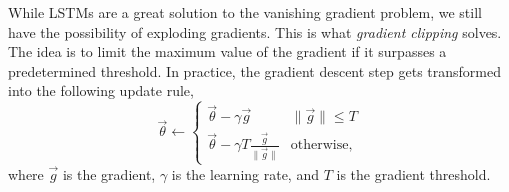 While LSTMs are a great solution to the vanishing gradient problem, we still have the possibility
of exploding gradients. This is what \textit{gradient clipping} solves. The idea is to limit the
maximum value of the gradient if it surpasses a predetermined threshold. In practice, the gradient
descent step gets transformed into the following update rule, \[
    \vec{\theta} \gets \begin{cases}
        \vec{\theta} - \gamma \vec{g}                         & \| \vec{g} \| \leq T \\
        \vec{\theta} - \gamma T \frac{\vec{g}}{\| \vec{g} \|} & \text{otherwise},
    \end{cases}
\]
where $\vec{g}$ is the gradient, $\gamma$ is the learning rate, and $T$ is the gradient threshold.
